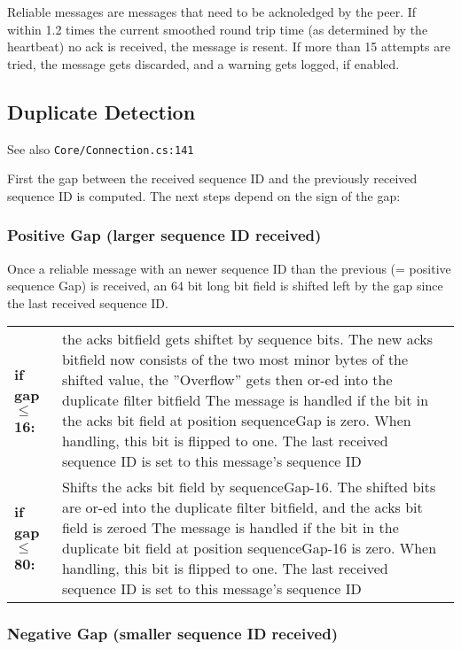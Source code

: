 Reliable messages are messages that need to be acknoledged by the peer. If within 1.2 times the current smoothed round trip time (as determined by the heartbeat) no ack is received, the message is resent. If more than 15 attempts are tried, the message gets discarded, and a warning gets logged, if enabled.

\subsection{Duplicate Detection}
See also \texttt{Core/Connection.cs:141}

First the gap between the received sequence ID and the previously received sequence ID is computed. The next steps depend on the sign of the gap:

\subsubsection{Positive Gap (larger sequence ID received)}

Once a reliable message with an newer sequence ID than the previous (= positive sequence Gap) is received, an 64 bit long bit field is shifted left by the gap since the last received sequence ID.

\begin{tabular}{p{\tableft}p{\tabright}}
	\textbf{if gap $\le$ 16:} & the acks bitfield gets shiftet by sequence bits. The new acks bitfield now consists of the two most minor bytes of the shifted value, the ''Overflow'' gets then or-ed into the duplicate filter bitfield \newline The message is handled if the bit in the acks bit field at position sequenceGap is zero. When handling, this bit is flipped to one. \newline The last received sequence ID is set to this message's sequence ID \\
	\textbf{if gap $\le$ 80:} & Shifts the acks bit field by sequenceGap-16. The shifted bits are or-ed into the duplicate filter bitfield, and the acks bit field is zeroed \newline The message is handled if the bit in the duplicate bit field at position sequenceGap-16 is zero. When handling, this bit is flipped to one. \newline The last received sequence ID is set to this message's sequence ID \\
\end{tabular}

\subsubsection{Negative Gap (smaller sequence ID received)}

